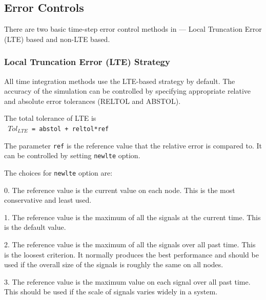 \subsection{Error Controls}
\label{Time_Step_Selection}
  

There are two basic time-step error control methods in \Xyce{} ---
Local Truncation Error (LTE) based and non-LTE based.


\subsubsection{Local Truncation Error (LTE) Strategy}
 

All time integration methods use the LTE-based strategy by
default. The accuracy of the simulation can be controlled by
specifying appropriate relative and absolute error tolerances (RELTOL
and ABSTOL).


The total tolerance of LTE is
{\\
\texttt{ $Tol_{LTE}$  = abstol +  reltol*ref}  
}

The parameter \verb|ref| is the reference value that the relative
error is compared to. It can be controlled by setting \verb|newlte|
option.


The  choices for \verb|newlte| option are:

\begin{XyceItemize} 
\item 0. The reference value is the current value on each node. This is the most conservative and least used.
\item 1. The reference value is the maximum of all the signals at the current time. This is the default value.
\item 2. The reference value is the maximum of all the signals over all past time. This is the loosest criterion. It normally produces the best performance and should be used if the overall size of the signals is roughly the same on all nodes.
\item 3. The reference value is the maximum value on each signal over all past time. This should be used if the scale of signals varies widely in a system.
\end{XyceItemize}

